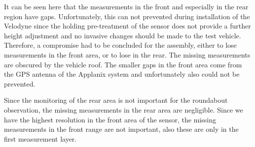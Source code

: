 \documentclass[11pt,oneside,openright]{mpreport}
\begin{document}

It can be seen here that the measurements in the front and especially in the rear region have gaps. Unfortunately, this can not prevented during installation of the Velodyne since 
the holding pre-treatment of the sensor does not provide a further height adjustment and no invasive changes should be made to the test vehicle. 
Therefore, a compromise had to be concluded for the assembly, either to lose measurements in the front area, or to lose in the rear.
The missing measurements are obscured by the vehicle roof. The smaller gaps in the front area come from the GPS antenna of the Applanix system and unfortunately also 
could not be prevented.


Since the monitoring of the rear area is not important for the roundabout observation, the missing measurements in the rear area are negligible. 
Since we have the highest resolution in the front area of the sensor, the missing measurements in the front range are not important,
also these are only in the first measurement layer.


\end{document}

